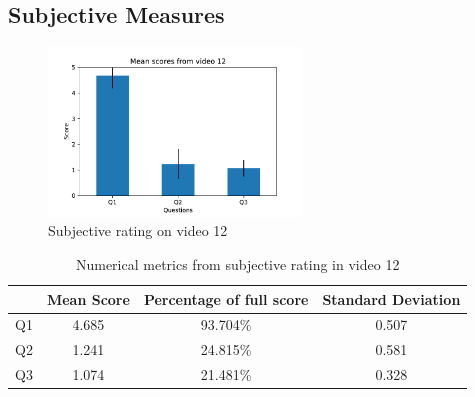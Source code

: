 \subsection{Subjective Measures}

\begin{figure}[H]
    \centering
    \includegraphics[width=0.6\textwidth]{img/subjective_measures/analysis/video_12.pdf}
    \caption{Subjective rating on video 12}
    \label{fig:visual_subj_vid12}
\end{figure}

\begin{table}[H]
    \centering
    \begin{tabular}{|c|c c c|} 
        \hline
           & \textbf{Mean Score} & \textbf{Percentage of full score} & \textbf{Standard Deviation} \\ [0.5ex] 
        \hline
        Q1 & 4.685 & 93.704\% & 0.507 \\ [1ex] 
        Q2 & 1.241 & 24.815\% & 0.581 \\ [1ex] 
        Q3 & 1.074 & 21.481\% & 0.328 \\ [1ex] 
        \hline
    \end{tabular}
    \caption{Numerical metrics from subjective rating in video 12}
    \label{tab:numerical_subj_vid12}
\end{table}
